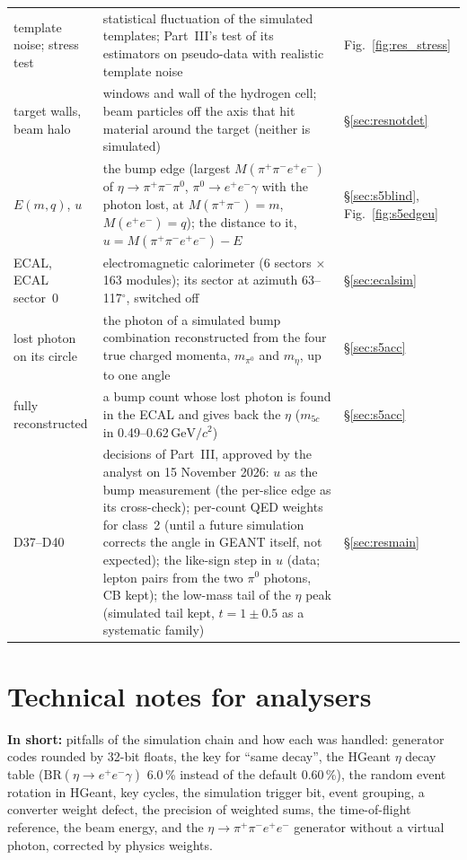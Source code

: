 \documentclass[11pt,a4paper]{article}
\newcommand{\piz}{\ensuremath{\pi^{0}}\xspace}
\newcommand{\ee}{\ensuremath{e^{+}e^{-}}\xspace}
\newcommand{\pipi}{\ensuremath{\pi^{+}\pi^{-}}\xspace}
\newcommand{\ppee}{\ensuremath{\pi^{+}\pi^{-}e^{+}e^{-}}\xspace}
\newcommand{\Mfour}{\ensuremath{M(\pi^{+}\pi^{-}e^{+}e^{-})}\xspace}
\newcommand{\Mee}{\ensuremath{M(e^{+}e^{-})}\xspace}
\newcommand{\Mpipi}{\ensuremath{M(\pi^{+}\pi^{-})}\xspace}
\newcommand{\GeVcc}{\ensuremath{\mathrm{GeV}/c^{2}}\xspace}
\newcommand{\inshort}[1]{\par\noindent\colorbox{black!5}{\parbox{\dimexpr\linewidth-2\fboxsep\relax}{\textbf{In short:} #1}}\par}
\begin{document}
{\begin{longtable}{@{}>{\raggedright\arraybackslash}p{3.0cm} >{\raggedright\arraybackslash}p{\dimexpr\textwidth-3.0cm-2.2cm-4\tabcolsep\relax} >{\raggedright\arraybackslash}p{2.2cm}@{}}
template noise; stress test & statistical fluctuation of the simulated templates; Part~III's test of its estimators on pseudo-data with realistic template noise & Fig.~\ref{fig:res_stress} \\
target walls, beam halo & windows and wall of the hydrogen cell; beam particles off the axis that hit material around the target (neither is simulated) & \S\ref{sec:resnotdet} \\
$E(m,q)$, $u$ & the bump edge (largest \Mfour of $\eta\to\pipi\piz$, $\piz\to\ee\gamma$ with the photon lost, at $\Mpipi=m$, $\Mee=q$); the distance to it, $u=\Mfour-E$ & \S\ref{sec:s5blind}, Fig.~\ref{fig:s5edgeu} \\
ECAL, ECAL sector~0 & electromagnetic calorimeter (6 sectors $\times$ 163 modules); its sector at azimuth 63--117$^\circ$, switched off & \S\ref{sec:ecalsim} \\
lost photon on its circle & the photon of a simulated bump combination reconstructed from the four true charged momenta, $m_{\piz}$ and $m_\eta$, up to one angle & \S\ref{sec:s5acc} \\
fully reconstructed & a bump count whose lost photon is found in the ECAL and gives back the $\eta$ ($m_{5c}$ in 0.49--0.62\,\GeVcc) & \S\ref{sec:s5acc} \\
D37--D40 & decisions of Part~III, approved by the analyst on 15 November 2026: $u$ as the bump measurement (the per-slice edge as its cross-check); per-count QED weights for class~2 (until a future simulation corrects the angle in GEANT itself, not expected); the like-sign step in $u$ (data; lepton pairs from the two \piz photons, CB kept); the low-mass tail of the $\eta$ peak (simulated tail kept, $t=1\pm0.5$ as a systematic family) & \S\ref{sec:resmain} \\
\end{longtable}
}

\section{Technical notes for analysers}
\label{sec:tech}
\inshort{pitfalls of the simulation chain and how each was handled: generator codes rounded by 32-bit floats, the
key for ``same decay'', the HGeant $\eta$ decay table ($\mathrm{BR}(\eta\to\ee\gamma)$ 6.0\,\% instead of the default
0.60\,\%),
the random event rotation in HGeant, key cycles, the simulation trigger bit, event grouping, a converter weight
defect, the precision of weighted sums, the time-of-flight reference, the beam energy, and the $\eta\to\ppee$
generator without a virtual photon, corrected by physics weights.}
\end{document}
